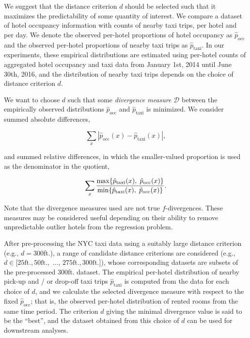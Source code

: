 \documentclass[useAMS, usenatbib]{biom}
\begin{document}
We suggest that the distance criterion $d$ should be selected such that it maximizes the predictability of some quantity of interest. We compare a dataset of hotel occupancy information with counts of nearby taxi trips, per hotel and per day. We denote the observed per-hotel proportions of hotel occupancy as $\hat{p}_{\mathrm{occ}}$ and the observed per-hotel proportions of nearby taxi trips as $\hat{p}_{\mathrm{taxi}}$. In our experiments, these empirical distributions are estimated using per-hotel counts of aggregated hotel occupancy and taxi data from January 1st, 2014 until June 30th, 2016, and the distribution of nearby taxi trips depends on the choice of distance criterion $d$.

We want to choose $d$ such that some \textit{divergence measure} $\mathcal{D}$ between the empirically observed distributions $\hat{p}_{\mathrm{occ}}$ and $\hat{p}_{\mathrm{taxi}}$ is minimized. We consider summed absolute differences,

$$\sum_x | \hat{p}_{\mathrm{occ}} (x) - \hat{p}_{\mathrm{taxi}} (x) |,$$

and summed relative differences, in which the smaller-valued proportion is used as the denominator in the quotient,

$$\sum_x \frac{\max \{ \hat{p}_{\mathrm{taxi}} (x), \hspace*{0.1cm} \hat{p}_{\mathrm{occ}} (x) \}}{\min \{ \hat{p}_{\mathrm{taxi}} (x), \hspace*{0.1cm} \hat{p}_{\mathrm{occ}} (x) \}}.$$

Note that the divergence measures used are not true $f$-divergences. These measures may be considered useful depending on their ability to remove unpredictable outlier hotels from the regression problem.

After pre-processing the NYC taxi data using a suitably large distance criterion (e.g., $d = 300$ft.), a range of candidate distance criterions are considered (e.g., $d \in [25 \mathrm{ft.}, 50 \mathrm{ft.},$ ..., $275 \mathrm{ft.}, 300 \mathrm{ft.}]$), whose corresponding datasets are subsets of the pre-processed 300ft. dataset. The empirical per-hotel distribution of nearby pick-up and / or drop-off taxi trips $\hat{p}_{\mathrm{taxi}}$ is computed from the data for each choice of $d$, and we calculate the selected divergence measure with respect to the fixed $\hat{p}_{\mathrm{occ}}$; that is, the observed per-hotel distribution of rented rooms from the same time period. The criterion $d$ giving the minimal divergence value is said to be the ``best'', and the dataset obtained from this choice of $d$ can be used for downstream analyses.
\end{document}

